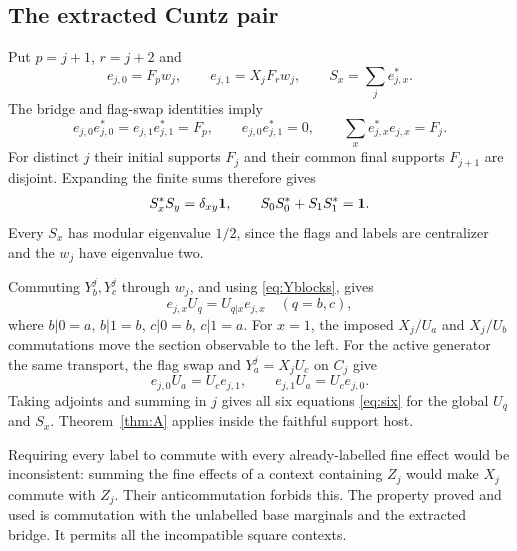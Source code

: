 \subsection{The extracted Cuntz pair}
Put $p=j+1$, $r=j+2$ and
\begin{equation}\label{eq:extracted}
 e_{j,0}=F_pw_j,\qquad e_{j,1}=X_jF_rw_j,\qquad
 S_x=\sum_j e_{j,x}^*.
\end{equation}
The bridge and flag-swap identities imply
\[
 e_{j,0}e_{j,0}^*=e_{j,1}e_{j,1}^*=F_p,\qquad
 e_{j,0}e_{j,1}^*=0,\qquad
 \sum_x e_{j,x}^*e_{j,x}=F_j.
\]
For distinct $j$ their initial supports $F_j$ and their common final supports $F_{j+1}$ are disjoint. Expanding the finite sums therefore gives
\[
 S_x^*S_y=\delta_{xy}\mathbf1,\qquad
 S_0S_0^*+S_1S_1^*=\mathbf1.
\]
Every $S_x$ has modular eigenvalue $1/2$, since the flags and labels are centralizer and the $w_j$ have eigenvalue two.

Commuting $Y_b^j,Y_c^j$ through $w_j$, and using \eqref{eq:Yblocks}, gives
\[
 e_{j,x}U_q=U_{q|x}e_{j,x}\quad(q=b,c),
\]
where $b|0=a$, $b|1=b$, $c|0=b$, $c|1=a$. For $x=1$, the imposed $X_j/U_a$ and $X_j/U_b$ commutations move the section observable to the left. For the active generator the same transport, the flag swap and $Y_a^j=X_jU_c$ on $C_j$ give
\[
 e_{j,0}U_a=U_ce_{j,1},\qquad e_{j,1}U_a=U_ce_{j,0}.
\]
Taking adjoints and summing in $j$ gives all six equations \eqref{eq:six} for the global $U_q$ and $S_x$. Theorem~\ref{thm:A} applies inside the faithful support host.

\begin{remark}\label{rem:literal}
Requiring every label to commute with every already-labelled fine effect would be inconsistent: summing the fine effects of a context containing $Z_j$ would make $X_j$ commute with $Z_j$. Their anticommutation forbids this. The property proved and used is commutation with the unlabelled base marginals and the extracted bridge. It permits all the incompatible square contexts.
\end{remark}
